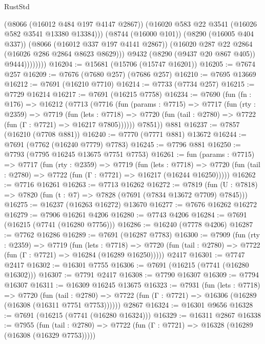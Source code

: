 \begin{lexlean}{RustStd}
\begin{coremodule}
                        (@8066 (@16012 @484 @197 @4147 @2867))
                        (@16020 @583 @22 @3541 (@16026 @582 @3541 @13380 @13384)))
                      (@8744 (@16000 @101))
                      (@8290 (@16005 @404 @337))
                      (@8066 (@16012 @337 @197 @4141 @2867))
                      (@16020 @287 @22 @2864 (@16026 @286 @2864 @8623 @8629)))
                    @9432
                    (@8290 (@9437 @20 @867 @405))
                    @9444))))))))
@16204 := @15681 (@15706 (@15747 @16201))
@16205 := @7674 @257
@16209 := @7676 (@7680 @257) (@7686 @257)
@16210 := @7695 @13669
@16212 := @7691 (@16210 @7710)
@16214 := @7733 (@7734 @257)
@16215 := @7729 @16214
@16217 := @7691 (@16215 @7758)
@16234 := @7690
    (fun (fn : @176) =>
    @16212
      (@7713
        (@7716
          (fun (params : @7715) =>
          @7717
            (fun (rty : @2359) =>
            @7719
              (fun (lets : @7718) =>
              @7720 (fun (tail : @2780) => @7722 (fun (Γ : @7721) => @16217 @7805))))))
        @7851))
    @881
@16237 := @7857 (@16210 (@7708 @881))
@16240 := @7770 (@7771 @881) @13672
@16244 := @7691 (@7762 (@16240 @7779) @7783)
@16245 := @7796 @881
@16250 := @7793 (@7795 @16245 @13675 @7751 @7753)
@16261 := fun (params : @7715) =>
  @7717
    (fun (rty : @2359) =>
    @7719
      (fun (lets : @7718) =>
      @7720 (fun (tail : @2780) => @7722 (fun (Γ : @7721) => @16217 (@16244 @16250)))))
@16262 := @7716 @16261
@16263 := @7713 @16262
@16272 := @7819
    (fun (U : @7818) => @7820 (fun (t : @7) => @7828 (@7691 (@7834 @13672 @7709) @7845)))
@16275 := @16237 (@16263 @16272) @13670
@16277 := @7676 @16262 @16272
@16279 := @7906 @16261 @4206
@16280 := @7743 @4206
@16284 := @7691 (@16215 (@7741 (@16280 @7756)))
@16286 := @16240 (@7778 @4206)
@16287 := @7762 @16286
@16289 := @7691 (@16287 @7783)
@16300 := @7909
    (fun (rty : @2359) =>
    @7719
      (fun (lets : @7718) =>
      @7720 (fun (tail : @2780) => @7722 (fun (Γ : @7721) => @16284 (@16289 @16250)))))
    @2417
@16301 := @7747 @2417
@16302 := @16301 @7755
@16306 := @7691 (@16215 (@7741 (@16280 @16302)))
@16307 := @7791 @2417
@16308 := @7790 @16307
@16309 := @7794 @16307
@16311 := @16309 @16245 @13675
@16323 := @7931
    (fun (lets : @7718) =>
    @7720
      (fun (tail : @2780) =>
      @7722 (fun (Γ : @7721) => @16306 (@16289 (@16308 (@16311 @7751 @7753))))))
    @2867
@16324 := @16301 @9656
@16328 := @7691 (@16215 (@7741 (@16280 @16324)))
@16329 := @16311 @2867
@16338 := @7955
    (fun (tail : @2780) => @7722 (fun (Γ : @7721) => @16328 (@16289 (@16308 (@16329 @7753)))))

\end{coremodule}
\end{lexlean}
